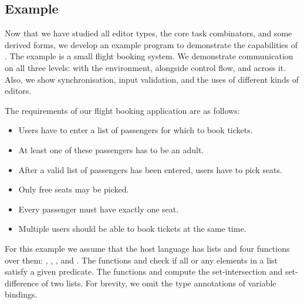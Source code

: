
\subsection{Example}
\label{sec:example}

Now that we have studied all editor types, the core task combinators, and some derived forms,
we develop an example program to demonstrate the capabilities of \TOPHAT.
The example is a small flight booking system.
We demonstrate communication on all three levels: with the environment, alongside control flow, and across it.
Also, we show synchronisation, input validation, and the uses of different kinds of editors.


The requirements of our flight booking application are as follows:
\begin{itemize}
  \item Users have to enter a list of passengers for which to book tickets.
  \item At least one of these passengers has to be an adult.
  \item After a valid list of passengers has been entered, users have to pick seats.
  \item Only free seats may be picked.
  \item Every passenger must have exactly one seat.
  \item Multiple users should be able to book tickets at the same time.
\end{itemize}

For this example we assume that the host language has lists and four functions over them:
, , , and .
The functions  and  check if all or any elements in a list satisfy a given predicate.
The functions  and  compute the set-intersection and set-difference of two lists.
For brevity, we omit the type annotations of variable bindings.


